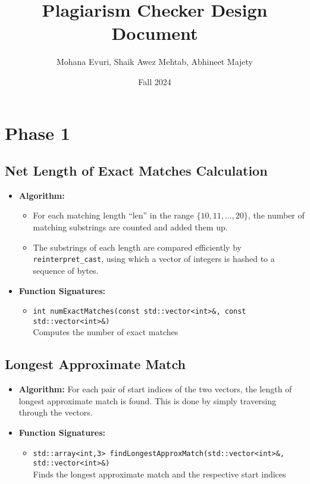 \documentclass[12pt]{article}
\title{Plagiarism Checker Design Document}
\author{Mohana Evuri, Shaik Awez Mehtab, Abhineet Majety}
\date{Fall 2024}
\begin{document}
\maketitle

\section{Phase 1}

\subsection{Net Length of Exact Matches Calculation}
\begin{itemize}[noitemsep]
    \item \textbf{Algorithm:} 
    \begin{itemize}
        \item For each matching length ``len'' in the range $\{10, 11, \ldots, 20\}$, the number of matching substrings are counted and added them up.
        \item The substrings of each length are compared efficiently by \texttt{reinterpret\_cast}, using which a vector of integers is hashed to a sequence of bytes.
    \end{itemize} 
    \item \textbf{Function Signatures:} 
    \begin{itemize}
        \item \texttt{int numExactMatches(const std::vector<int>\&, const std::vector<int>\&)} \\
        Computes the number of exact matches
    \end{itemize}
\end{itemize}

\subsection{Longest Approximate Match}
\begin{itemize}[noitemsep]
    \item \textbf{Algorithm:} For each pair of start indices of the two vectors, the length of longest approximate match is found. This is done by simply traversing through the vectors. 
    \item \textbf{Function Signatures:}
    \begin{itemize}
        \item \texttt{std::array<int,3> findLongestApproxMatch(std::vector<int>\&, std::vector<int>\&)} \\
        Finds the longest approximate match and the respective start indices
    \end{itemize}
\end{itemize}
\end{document}

